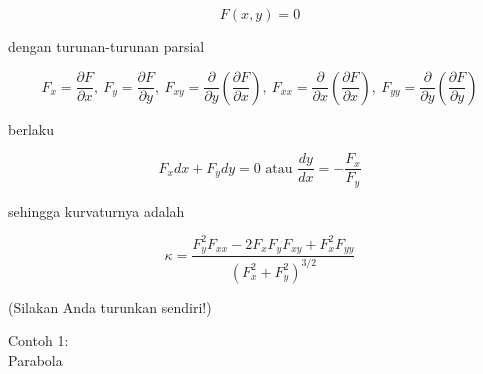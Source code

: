 \documentclass[12pt,Times new roman,letterpaper]{book}
\begin{document}
\begin{eulernootebook}
\begin{eulercomment}
\begin{eulercomment}
\begin{eulernootebook}
\begin{eulercomment}
\begin{eulercomment}
\begin{eulercomment}
\begin{eulercomment}
\begin{eulercomment}
\begin{eulercomment}
\begin{eulernotebook}
\begin{eulercomment}
\begin{eulercomment}
\begin{eulercomment}
\begin{eulercomment}
\begin{eulercomment}
\begin{eulercomment}
\begin{eulercomment}
\begin{eulercomment}
\begin{eulercomment}
\begin{eulercomment}
\begin{eulercomment}
\begin{eulercomment}
\begin{eulercomment}
\begin{eulercomment}
\begin{eulercomment}
\begin{eulercomment}
\begin{eulercomment}
\begin{eulercomment}
\begin{eulercomment}
\begin{eulercomment}
\begin{eulercomment}
\end{eulercomment}
\begin{eulerformula}
\[
F(x,y)=0
\]
\end{eulerformula}
\begin{eulercomment}
dengan turunan-turunan parsial

\end{eulercomment}
\begin{eulerformula}
\[
F_x=\frac{\partial F}{\partial x},\ F_y=\frac{\partial F}{\partial y},\ F_{xy}=\frac{\partial}{\partial y}\left(\frac{\partial F}{\partial x}\right),\ F_{xx}=\frac{\partial}{\partial x}\left(\frac{\partial F}{\partial x}\right),\ F_{yy}=\frac{\partial}{\partial y}\left(\frac{\partial F}{\partial y}\right)
\]
\end{eulerformula}
\begin{eulercomment}
berlaku

\end{eulercomment}
\begin{eulerformula}
\[
F_x dx+ F_y dy = 0\text{ atau } \frac{dy}{dx}=-\frac{F_x}{F_y}
\]
\end{eulerformula}
\begin{eulercomment}
sehingga kurvaturnya adalah

\end{eulercomment}
\begin{eulerformula}
\[
\kappa =\frac {F_y^2F_{xx}-2F_xF_yF_{xy}+F_x^2F_{yy}}{\left(F_x^2+F_y^2\right)^{3/2}}
\]
\end{eulerformula}
\begin{eulercomment}
(Silakan Anda turunkan sendiri!)

Contoh 1:\\
Parabola


\end{eulercomment}
\end{eulercomment}
\end{eulercomment}
\end{eulercomment}
\end{eulercomment}
\end{eulercomment}
\end{eulercomment}
\end{eulercomment}
\end{eulercomment}
\end{eulercomment}
\end{eulercomment}
\end{eulercomment}
\end{eulercomment}
\end{eulercomment}
\end{eulercomment}
\end{eulercomment}
\end{eulercomment}
\end{eulercomment}
\end{eulercomment}
\end{eulercomment}
\end{eulercomment}
\end{eulernotebook}
\end{eulercomment}
\end{eulercomment}
\end{eulercomment}
\end{eulercomment}
\end{eulercomment}
\end{eulercomment}
\end{eulernootebook}
\end{eulercomment}
\end{eulercomment}
\end{eulernootebook}
\end{document}
